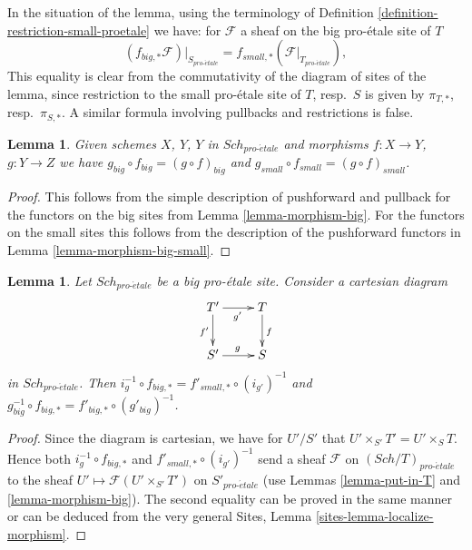 \documentclass{stacks-project}
\theoremstyle{plain}
\newtheorem{lemma}[subsection]{Lemma}
\theoremstyle{definition}
\theoremstyle{remark}
\numberwithin{equation}{subsection}
\def\Sch{\mathit{Sch}}
\def\proetale{{pro\text{-}\acute{e}tale}}
\begin{document}
\noindent
In the situation of the lemma, using the terminology of
Definition \ref{definition-restriction-small-proetale}
we have: for $\mathcal{F}$ a sheaf on the big pro-\'etale site of $T$
\begin{equation}
\label{equation-compare-big-small}
(f_{big, *}\mathcal{F})|_{S_\proetale} =
f_{small, *}(\mathcal{F}|_{T_\proetale}),
\end{equation}
This equality is clear from the commutativity of the diagram of
sites of the lemma, since restriction to the small pro-\'etale site of
$T$, resp.\ $S$ is given by $\pi_{T, *}$, resp.\ $\pi_{S, *}$. A similar
formula involving pullbacks and restrictions is false.

\begin{lemma}
\label{lemma-composition-proetale}
Given schemes $X$, $Y$, $Y$ in $\Sch_\proetale$
and morphisms $f : X \to Y$, $g : Y \to Z$ we have
$g_{big} \circ f_{big} = (g \circ f)_{big}$ and
$g_{small} \circ f_{small} = (g \circ f)_{small}$.
\end{lemma}

\begin{proof}
This follows from the simple description of pushforward
and pullback for the functors on the big sites from
Lemma \ref{lemma-morphism-big}. For the functors
on the small sites this follows from the description of
the pushforward functors in Lemma \ref{lemma-morphism-big-small}.
\end{proof}

\begin{lemma}
\label{lemma-morphism-big-small-cartesian-diagram}
Let $\Sch_\proetale$ be a big pro-\'etale site. Consider a cartesian diagram
$$
\xymatrix{
T' \ar[r]_{g'} \ar[d]_{f'} & T \ar[d]^f \\
S' \ar[r]^g & S
}
$$
in $\Sch_\proetale$. Then
$i_g^{-1} \circ f_{big, *} = f'_{small, *} \circ (i_{g'})^{-1}$
and $g_{big}^{-1} \circ f_{big, *} = f'_{big, *} \circ (g'_{big})^{-1}$.
\end{lemma}

\begin{proof}
Since the diagram is cartesian, we have for $U'/S'$
that $U' \times_{S'} T' = U' \times_S T$. Hence both
$i_g^{-1} \circ f_{big, *}$ and $f'_{small, *} \circ (i_{g'})^{-1}$
send a sheaf $\mathcal{F}$ on $(\Sch/T)_\proetale$ to the sheaf
$U' \mapsto \mathcal{F}(U' \times_{S'} T')$ on $S'_\proetale$
(use Lemmas \ref{lemma-put-in-T} and \ref{lemma-morphism-big}).
The second equality can be proved in the same manner or can be
deduced from the very general
Sites, Lemma \ref{sites-lemma-localize-morphism}.
\end{proof}
\end{document}

